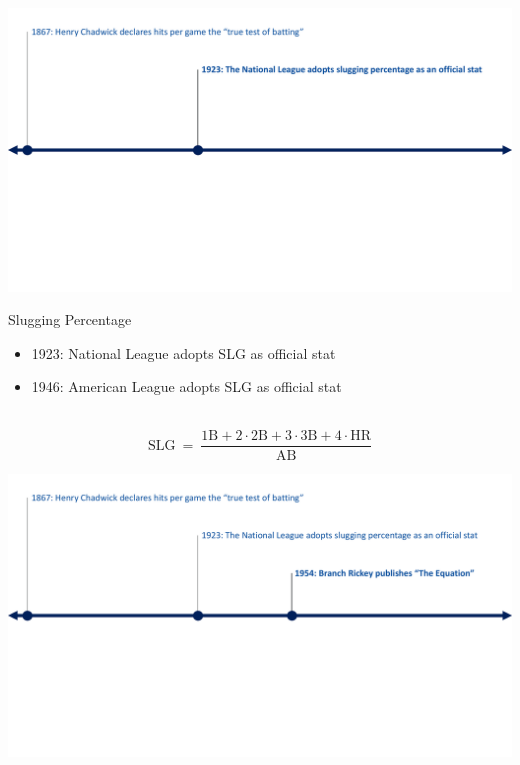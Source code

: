 \documentclass[handout]{beamer}
\begin{document}
\begin{frame}
  \includegraphics[width = \textwidth]{figures/timeline_1923.pdf}
\end{frame}

\begin{frame}{Slugging Percentage}
  \begin{itemize}
    \item 1923: National League adopts SLG as official stat
    \item 1946: American League adopts SLG as official stat
  \end{itemize}
  ~
  \vspace{1cm}
  ~
  $$
    \mbox{SLG}~=~\frac{\mbox{1B} + 2 \cdot \mbox{2B} + 3 \cdot \mbox{3B} + 4 \cdot \mbox{HR}}{\mbox{AB}}
  $$
\end{frame}

\begin{frame}
  \includegraphics[width = \textwidth]{figures/timeline_1954.pdf}
\end{frame}
\end{document}
